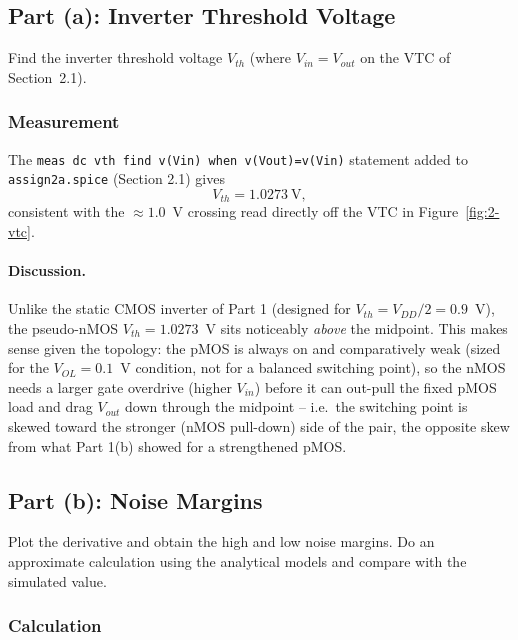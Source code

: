 \subsection{Part (a): Inverter Threshold Voltage}

Find the inverter threshold voltage $V_{th}$ (where $V_{in} = V_{out}$ on the
VTC of Section~2.1).

\subsubsection{Measurement}

The \texttt{meas dc vth find v(Vin) when v(Vout)=v(Vin)} statement added to
\texttt{assign2a.spice} (Section 2.1) gives
\[
V_{th} = 1.0273\ \text{V},
\]
consistent with the $\approx1.0$~V crossing read directly off the VTC in
Figure~\ref{fig:2-vtc}.

\paragraph{Discussion.} Unlike the static CMOS inverter of Part 1 (designed for
$V_{th}=V_{DD}/2=0.9$~V), the pseudo-nMOS $V_{th}=1.0273$~V sits noticeably
\emph{above} the midpoint. This makes sense given the topology: the pMOS is
always on and comparatively weak (sized for the $V_{OL}=0.1$~V condition, not
for a balanced switching point), so the nMOS needs a larger gate overdrive
(higher $V_{in}$) before it can out-pull the fixed pMOS load and drag $V_{out}$
down through the midpoint -- i.e.\ the switching point is skewed toward the
stronger (nMOS pull-down) side of the pair, the opposite skew from what Part
1(b) showed for a strengthened pMOS.

\subsection{Part (b): Noise Margins}

Plot the derivative and obtain the high and low noise margins. Do an approximate
calculation using the analytical models and compare with the simulated value.

\subsubsection{Calculation}

